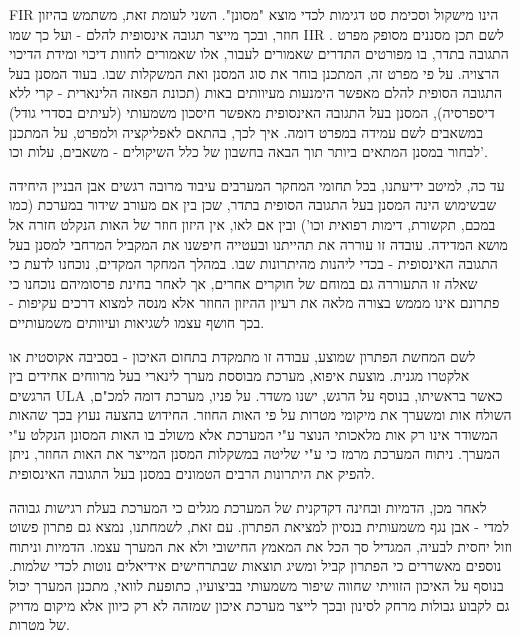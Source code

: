\textenglish{FIR}
הינו מישקול וסכימת סט דגימות לכדי מוצא "מסונן".
השני לעומת זאת, משתמש בהיזון חוזר, ובכך מייצר תגובה אינסופית להלם - ועל כך שמו
\textenglish{IIR}
.
לשם תכן מסננים מסופק מפרט התגובה בתדר, בו מפורטים התדרים שאמורים לעבור, אלו שאמורים לחוות דיכוי ומידת הדיכוי הרצויה.
על פי מפרט זה, המתכנן בוחר את סוג המסנן ואת המשקלות שבו.
בעוד המסנן בעל התגובה הסופית להלם מאפשר הימנעות מעיוותים באות (תכונת הפאזה הלינארית - קרי ללא דיספרסיה), המסנן בעל התגובה האינסופית מאפשר חיסכון משמעותי (לעיתים בסדרי גודל) במשאבים לשם עמידה במפרט דומה.
איך לכך, בהתאם לאפליקציה ולמפרט, על המתכנן לבחור במסנן המתאים ביותר תוך הבאה בחשבון של כלל השיקולים - משאבים, עלות וכו'.
\par
עד כה, למיטב ידיעתנו, בכל תחומי המחקר המערבים עיבוד מרובה רגשים אבן הבניין היחידה שבשימוש הינה המסנן בעל התגובה הסופית בתדר, שכן בין אם מעורב שידור במערכת (כמו במכם, תקשורת, דימות רפואית וכו') ובין אם לאו, אין היזון חוזר של האות הנקלט חזרה אל מושא המדידה.
עובדה זו עוררה את תהייתנו ובעטייה חיפשנו את המקביל המרחבי למסנן בעל התגובה האינסופית - בכדי ליהנות מהיתרונות שבו.
במהלך המחקר המקדים, נוכחנו לדעת כי שאלה זו התעוררה גם במוחם של חוקרים אחרים, אך לאחר בחינת פרסומיהם נוכחנו כי פתרונם אינו מממש בצורה מלאה את רעיון ההיזון החוזר אלא מנסה למצוא דרכים עקיפות - בכך חושף עצמו לשגיאות ועיוותים משמעותיים.
\par
לשם המחשת הפתרון שמוצע, עבודה זו מתמקדת בתחום האיכון - בסביבה אקוסטית או אלקטרו מגנית.
מוצעת איפוא, מערכת מבוססת מערך לינארי בעל מרווחים אחידים בין הרגשים
\textenglish{ULA}
כאשר בראשיתו, בנוסף על הרגש,  ישנו משדר.
על פניו, מערכת דומה למכ"ם, השולח אות ומשערך את מיקומי מטרות על פי האות החוזר.
החידוש בהצעה נעוץ בכך שהאות המשודר אינו רק אות מלאכותי הנוצר ע"י המערכת אלא משולב בו האות המסונן הנקלט ע"י המערך.
ניתוח המערכת מרמז כי ע"י שליטה במשקלות המסנן המייצר את האות החוזר, ניתן להפיק את היתרונות הרבים הטמונים במסנן בעל התגובה האינסופית.
\par
לאחר מכן, הדמיות ובחינה דקדקנית של המערכת מגלים כי המערכת בעלת רגישות גבוהה למדי - אבן נגף משמעותית בנסיון למציאת הפתרון.
עם זאת, לשמחתנו, נמצא גם פתרון פשוט וזול יחסית לבעיה, המגדיל סך הכל את המאמץ החישובי ולא את המערך עצמו.
הדמיות וניתוח נוספים מאשררים כי הפתרון קביל ומשיג תוצאות שבתרחישים אידיאלים נוטות לכדי שלמות.
בנוסף על האיכון הזוויתי שחווה שיפור משמעותי בביצועיו, כתופעת לוואי, מתכנן המערך יכול גם לקבוע גבולות מרחק לסינון ובכך לייצר מערכת איכון שמזהה לא רק כיוון אלא מיקום מדויק של מטרות.

